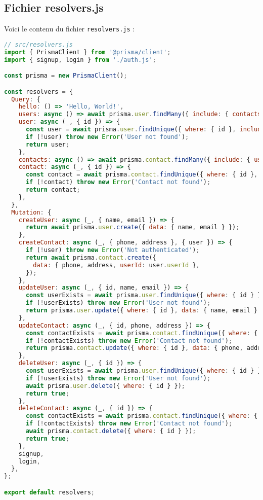 \documentclass{article}
\begin{document}
\subsection{Fichier resolvers.js}
Voici le contenu du fichier \texttt{resolvers.js} :
\begin{lstlisting}[language=JavaScript]
// src/resolvers.js
import { PrismaClient } from '@prisma/client';
import { signup, login } from './auth.js';

const prisma = new PrismaClient();

const resolvers = {
  Query: {
    hello: () => 'Hello, World!',
    users: async () => await prisma.user.findMany({ include: { contacts: true } }),
    user: async (_, { id }) => {
      const user = await prisma.user.findUnique({ where: { id }, include: { contacts: true } });
      if (!user) throw new Error('User not found');
      return user;
    },
    contacts: async () => await prisma.contact.findMany({ include: { user: true } }),
    contact: async (_, { id }) => {
      const contact = await prisma.contact.findUnique({ where: { id }, include: { user: true } });
      if (!contact) throw new Error('Contact not found');
      return contact;
    },
  },
  Mutation: {
    createUser: async (_, { name, email }) => {
      return await prisma.user.create({ data: { name, email } });
    },
    createContact: async (_, { phone, address }, { user }) => {
      if (!user) throw new Error('Not authenticated');
      return await prisma.contact.create({
        data: { phone, address, userId: user.userId },
      });
    },
    updateUser: async (_, { id, name, email }) => {
      const userExists = await prisma.user.findUnique({ where: { id } });
      if (!userExists) throw new Error('User not found');
      return prisma.user.update({ where: { id }, data: { name, email } });
    },
    updateContact: async (_, { id, phone, address }) => {
      const contactExists = await prisma.contact.findUnique({ where: { id } });
      if (!contactExists) throw new Error('Contact not found');
      return prisma.contact.update({ where: { id }, data: { phone, address } });
    },
    deleteUser: async (_, { id }) => {
      const userExists = await prisma.user.findUnique({ where: { id } });
      if (!userExists) throw new Error('User not found');
      await prisma.user.delete({ where: { id } });
      return true;
    },
    deleteContact: async (_, { id }) => {
      const contactExists = await prisma.contact.findUnique({ where: { id } });
      if (!contactExists) throw new Error('Contact not found');
      await prisma.contact.delete({ where: { id } });
      return true;
    },
    signup,
    login,
  },
};

export default resolvers;
\end{lstlisting}
\end{document}

